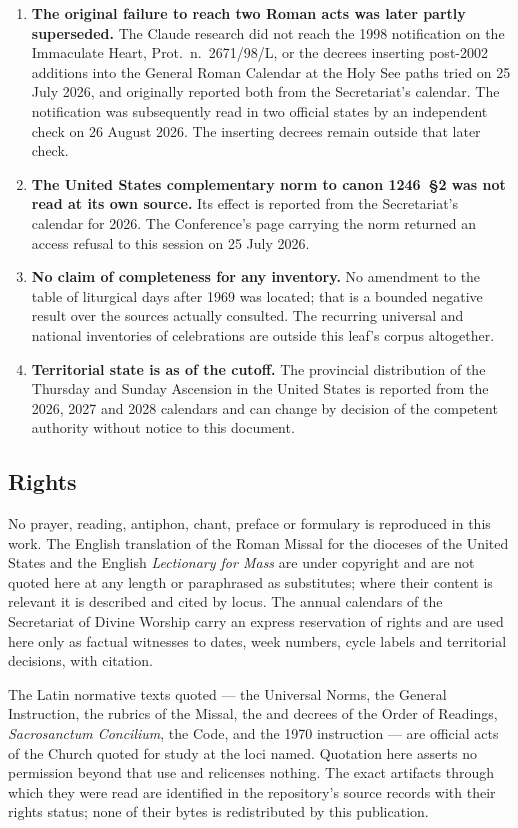 \begin{enumerate}
proof that no such text exists.
\item \textbf{The original failure to reach two Roman acts was later partly superseded.} The Claude
research did not reach the 1998 notification on the Immaculate Heart, Prot.\ n.\ 2671/98/L, or the
decrees inserting post-2002 additions into the General Roman Calendar at the Holy See paths tried on
25 July 2026, and originally reported both from the Secretariat's calendar. The notification was
subsequently read in two official states by an independent check on 26 August 2026. The inserting
decrees remain outside that later check.
\item \textbf{The United States complementary norm to canon 1246~\S2 was not read at its own source.}
Its effect is reported from the Secretariat's calendar for 2026. The Conference's page carrying the
norm returned an access refusal to this session on 25 July 2026.
\item \textbf{No claim of completeness for any inventory.} No amendment to the table of liturgical
days after 1969 was located; that is a bounded negative result over the sources actually consulted.
The recurring universal and national inventories of celebrations are outside this leaf's corpus
altogether.
\item \textbf{Territorial state is as of the cutoff.} The provincial distribution of the Thursday and
Sunday Ascension in the United States is reported from the 2026, 2027 and 2028 calendars and can
change by decision of the competent authority without notice to this document.
\end{enumerate}

\subsection{Rights}

No prayer, reading, antiphon, chant, preface or formulary is reproduced in this work. The English
translation of the Roman Missal for the dioceses of the United States and the English \emph{Lectionary
for Mass} are under copyright and are not quoted here at any length or paraphrased as substitutes;
where their content is relevant it is described and cited by locus. The annual calendars of the
Secretariat of Divine Worship carry an express reservation of rights and are used here only as
factual witnesses to dates, week numbers, cycle labels and territorial decisions, with citation.

The Latin normative texts quoted --- the Universal Norms, the General Instruction, the rubrics of the
Missal, the  and decrees of the Order of Readings, \emph{Sacrosanctum Concilium},
the Code, and the 1970 instruction --- are official acts of the Church quoted for study at the loci
named. Quotation here asserts no permission beyond that use and relicenses nothing. The exact
artifacts through which they were read are identified in the repository's source records with their
rights status; none of their bytes is redistributed by this publication.

